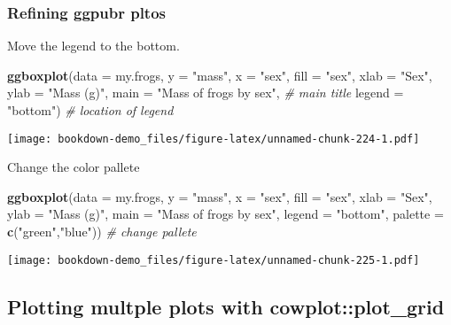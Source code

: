 \documentclass[]{book}
\newenvironment{Shaded}{\begin{snugshade}}{\end{snugshade}}
\newcommand{\KeywordTok}[1]{\textcolor[rgb]{0.13,0.29,0.53}{\textbf{#1}}}
\newcommand{\DataTypeTok}[1]{\textcolor[rgb]{0.13,0.29,0.53}{#1}}
\newcommand{\StringTok}[1]{\textcolor[rgb]{0.31,0.60,0.02}{#1}}
\newcommand{\CommentTok}[1]{\textcolor[rgb]{0.56,0.35,0.01}{\textit{#1}}}
\newcommand{\NormalTok}[1]{#1}
\theoremstyle{definition}
\theoremstyle{definition}
\theoremstyle{definition}
\theoremstyle{remark}
\begin{document}
\subsubsection{Refining ggpubr pltos}\label{refining-ggpubr-pltos}

Move the legend to the bottom.

\begin{Shaded}
\begin{Highlighting}[]
\KeywordTok{ggboxplot}\NormalTok{(}\DataTypeTok{data =}\NormalTok{ my.frogs,}
          \DataTypeTok{y =} \StringTok{"mass"}\NormalTok{,}
          \DataTypeTok{x =} \StringTok{"sex"}\NormalTok{,}
          \DataTypeTok{fill =} \StringTok{"sex"}\NormalTok{,}
          \DataTypeTok{xlab =} \StringTok{"Sex"}\NormalTok{,}
          \DataTypeTok{ylab =} \StringTok{"Mass (g)"}\NormalTok{,}
          \DataTypeTok{main =} \StringTok{"Mass of frogs by sex"}\NormalTok{, }\CommentTok{# main title}
          \DataTypeTok{legend =} \StringTok{"bottom"}\NormalTok{)             }\CommentTok{# location of legend}
\end{Highlighting}
\end{Shaded}

\texttt{[image: bookdown-demo\_files/figure-latex/unnamed-chunk-224-1.pdf]}

Change the color pallete

\begin{Shaded}
\begin{Highlighting}[]
\KeywordTok{ggboxplot}\NormalTok{(}\DataTypeTok{data =}\NormalTok{ my.frogs,}
          \DataTypeTok{y =} \StringTok{"mass"}\NormalTok{,}
          \DataTypeTok{x =} \StringTok{"sex"}\NormalTok{,}
          \DataTypeTok{fill =} \StringTok{"sex"}\NormalTok{,}
          \DataTypeTok{xlab =} \StringTok{"Sex"}\NormalTok{,}
          \DataTypeTok{ylab =} \StringTok{"Mass (g)"}\NormalTok{,}
          \DataTypeTok{main =} \StringTok{"Mass of frogs by sex"}\NormalTok{,}
          \DataTypeTok{legend =} \StringTok{"bottom"}\NormalTok{,}
          \DataTypeTok{palette =} \KeywordTok{c}\NormalTok{(}\StringTok{"green"}\NormalTok{,}\StringTok{"blue"}\NormalTok{))  }\CommentTok{# change pallete}
\end{Highlighting}
\end{Shaded}

\texttt{[image: bookdown-demo\_files/figure-latex/unnamed-chunk-225-1.pdf]}

\subsection{Plotting multple plots with
cowplot::plot\_grid}\label{plotting-multple-plots-with-cowplotplot_grid}
\end{document}
